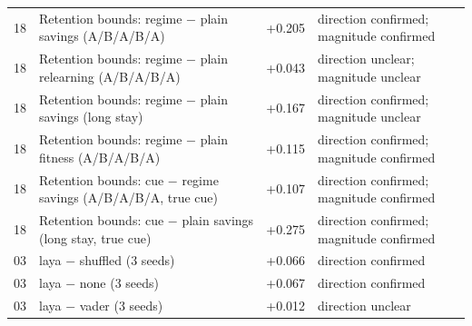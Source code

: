 \begin{table}[t]
\begin{tabular}{@{}lp{}rp{}@{}}
18 & Retention bounds: regime $-$ plain savings (A/B/A/B/A) & +0.205 & direction confirmed; magnitude confirmed \\
18 & Retention bounds: regime $-$ plain relearning (A/B/A/B/A) & +0.043 & direction unclear; magnitude unclear \\
18 & Retention bounds: regime $-$ plain savings (long stay) & +0.167 & direction confirmed; magnitude unclear \\
18 & Retention bounds: regime $-$ plain fitness (A/B/A/B/A) & +0.115 & direction confirmed; magnitude confirmed \\
18 & Retention bounds: cue $-$ regime savings (A/B/A/B/A, true cue) & +0.107 & direction confirmed; magnitude confirmed \\
18 & Retention bounds: cue $-$ plain savings (long stay, true cue) & +0.275 & direction confirmed; magnitude confirmed \\
03 & laya $-$ shuffled (3 seeds) & +0.066 & direction confirmed \\
03 & laya $-$ none (3 seeds) & +0.067 & direction confirmed \\
03 & laya $-$ vader (3 seeds) & +0.012 & direction unclear \\
\bottomrule\end{tabular}\end{table}
